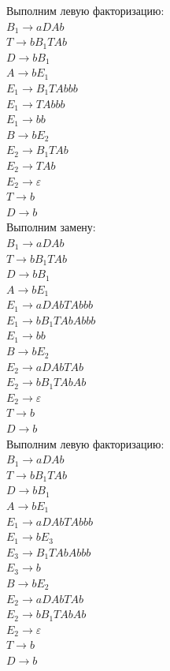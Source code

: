 \documentclass[a4paper,14pt]{extarticle}
\begin{document}
\begin{enumerate}[1.]
Выполним левую факторизацию:\\
$B_1 \rightarrow aDAb$\\
$T \rightarrow bB_1TAb$\\
$D \rightarrow bB_1$\\
$A \rightarrow bE_1$\\
$E_1 \rightarrow B_1TAbbb$\\
$E_1 \rightarrow TAbbb$\\
$E_1 \rightarrow bb$\\ 
$B \rightarrow bE_2$\\
$E_2 \rightarrow B_1TAb$\\
$E_2 \rightarrow TAb$\\
$E_2 \rightarrow \varepsilon$\\
$T \rightarrow b$\\
$D \rightarrow b$\\

Выполним замену:\\
$B_1 \rightarrow aDAb$\\
$T \rightarrow bB_1TAb$\\
$D \rightarrow bB_1$\\
$A \rightarrow bE_1$\\
$E_1 \rightarrow aDAbTAbbb$\\
$E_1 \rightarrow bB_1TAbAbbb$\\
$E_1 \rightarrow bb$\\ 
$B \rightarrow bE_2$\\
$E_2 \rightarrow aDAbTAb$\\
$E_2 \rightarrow bB_1TAbAb$\\
$E_2 \rightarrow \varepsilon$\\
$T \rightarrow b$\\
$D \rightarrow b$\\

Выполним левую факторизацию:\\
$B_1 \rightarrow aDAb$\\
$T \rightarrow bB_1TAb$\\
$D \rightarrow bB_1$\\
$A \rightarrow bE_1$\\
$E_1 \rightarrow aDAbTAbbb$\\
$E_1 \rightarrow bE_3$\\ 
$E_3 \rightarrow B_1TAbAbbb$\\
$E_3 \rightarrow b$\\
$B \rightarrow bE_2$\\
$E_2 \rightarrow aDAbTAb$\\
$E_2 \rightarrow bB_1TAbAb$\\
$E_2 \rightarrow \varepsilon$\\
$T \rightarrow b$\\
$D \rightarrow b$\\


\end{enumerate}
\end{document}
